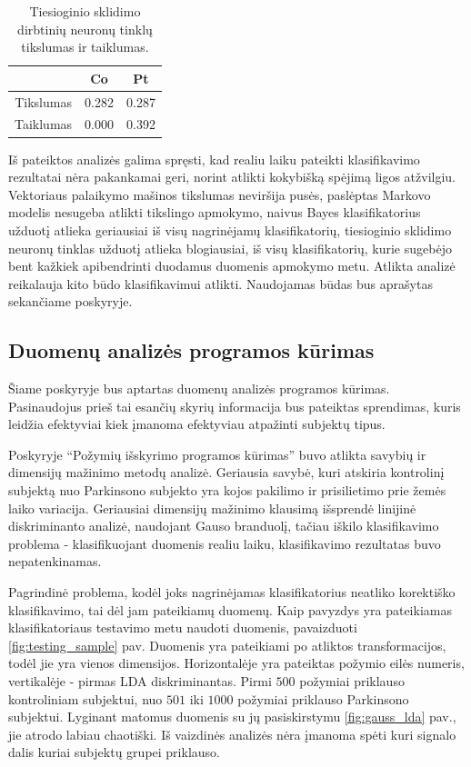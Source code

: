 \documentclass[]{vgtuef}
\begin{document}
\begin{table}[!t]
  \centering
  \caption{Tiesioginio sklidimo dirbtinių neuronų tinklų tikslumas ir taiklumas.}
  \label{table:ffn_scores}
  \begin{tabular}{|c|c|c|} \hline
    & Co & Pt \\ \hline
    Tikslumas & 0.282 & 0.287 \\ \hline
    Taiklumas & 0.000 & 0.392 \\ \hline
  \end{tabular}
\end{table}

Iš pateiktos analizės galima spręsti, kad realiu laiku pateikti klasifikavimo rezultatai nėra pakankamai geri, norint atlikti kokybišką spėjimą ligos atžvilgiu. Vektoriaus palaikymo mašinos tikslumas neviršija pusės, paslėptas Markovo modelis nesugeba atlikti tikslingo apmokymo, naivus Bayes klasifikatorius užduotį atlieka geriausiai iš visų nagrinėjamų klasifikatorių, tiesioginio sklidimo neuronų tinklas užduotį atlieka blogiausiai, iš visų klasifikatorių, kurie sugebėjo bent kažkiek apibendrinti duodamus duomenis apmokymo metu. Atlikta analizė reikalauja kito būdo klasifikavimui atlikti. Naudojamas būdas bus aprašytas sekančiame poskyryje.

\subsection{Duomenų analizės programos kūrimas}

Šiame poskyryje bus aptartas duomenų analizės programos kūrimas. Pasinaudojus prieš tai esančių skyrių informacija bus pateiktas sprendimas, kuris leidžia efektyviai kiek įmanoma efektyviau atpažinti subjektų tipus.

Poskyryje ``Požymių išskyrimo programos kūrimas'' buvo atlikta savybių ir dimensijų mažinimo metodų analizė. Geriausia savybė, kuri atskiria kontrolinį subjektą nuo Parkinsono subjekto yra kojos pakilimo ir prisilietimo prie žemės laiko variacija. Geriausiai dimensijų mažinimo klausimą išsprendė linijinė diskriminanto analizė, naudojant Gauso branduolį, tačiau iškilo klasifikavimo problema - klasifikuojant duomenis realiu laiku, klasifikavimo rezultatas buvo nepatenkinamas. 

Pagrindinė problema, kodėl joks nagrinėjamas klasifikatorius neatliko korektiško klasifikavimo, tai dėl jam pateikiamų duomenų. Kaip pavyzdys yra pateikiamas klasifikatoriaus testavimo metu naudoti duomenis, pavaizduoti \ref{fig:testing_sample} pav. Duomenis yra pateikiami po atliktos transformacijos, todėl jie yra vienos dimensijos. Horizontalėje yra pateiktas požymio eilės numeris, vertikalėje - pirmas LDA diskriminantas. Pirmi $500$ požymiai priklauso kontroliniam subjektui, nuo $501$ iki $1000$ požymiai priklauso Parkinsono subjektui. Lyginant matomus duomenis su jų pasiskirstymu \ref{fig:gauss_lda} pav., jie atrodo labiau chaotiški. Iš vaizdinės analizės nėra įmanoma spėti kuri signalo dalis kuriai subjektų grupei priklauso. 
\end{document}
